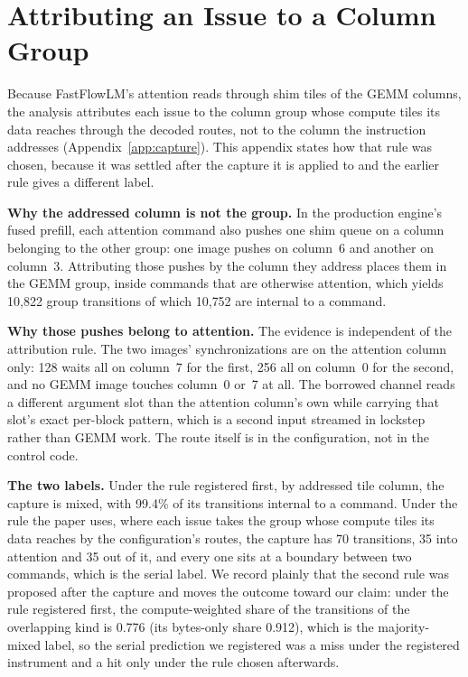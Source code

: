 \section{Attributing an Issue to a Column Group}
\label{app:attribution}

Because FastFlowLM's attention reads through shim tiles of the GEMM columns, the analysis attributes each issue to the column group whose compute tiles its data reaches through the decoded routes, not to the column the instruction addresses (Appendix~\ref{app:capture}).
This appendix states how that rule was chosen,
because it was settled after the capture it is applied to and the earlier rule gives a different label.

\textbf{Why the addressed column is not the group.} In the production engine's fused prefill, each attention command
also pushes one shim queue on a column belonging to the other group: one image pushes on column~6 and another on
column~3. Attributing those pushes by the column they address places them in the GEMM group, inside commands that are
otherwise attention, which yields 10{,}822 group transitions of which 10{,}752 are internal to a command.

\textbf{Why those pushes belong to attention.} The evidence is independent of the attribution rule. The two images'
synchronizations are on the attention column only: 128 waits all on column~7 for the first, 256 all on column~0 for
the second, and no GEMM image touches column~0 or~7 at all. The borrowed channel reads a different argument slot than
the attention column's own while carrying that slot's exact per-block pattern, which is a second input streamed in
lockstep rather than GEMM work. The route itself is in the configuration, not in the control code.

\textbf{The two labels.} Under the rule registered first, by addressed tile column, the capture is mixed, with 99.4\%
of its transitions internal to a command. Under the rule the paper uses, where each issue takes the group whose compute
tiles its data reaches by the configuration's routes, the capture has 70 transitions, 35 into attention and 35 out of it,
and every one sits at a boundary between two commands, which is the serial label. We record plainly that the second
rule was proposed after the capture and moves the outcome toward our claim: under the rule registered first, the
compute-weighted share of the transitions of the overlapping kind is 0.776 (its bytes-only share 0.912), which is the
majority-mixed label, so the serial prediction we registered was a miss under the registered instrument and a hit
only under the rule chosen afterwards.

